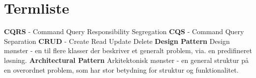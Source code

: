 \section{Termliste}
\textbf{CQRS} - Command Query Responsibility Segregation
\newline
\textbf{CQS} - Command Query Separation
\newline
\textbf{CRUD} - Create Read Update Delete
\newline
\textbf{Design Pattern} Design mønster - en til flere klasser der beskriver et generalt problem, via. en predifineret løsning. 
\newline
\textbf{Architectural Pattern} Arkitektonisk mønster - en general struktur på en overordnet problem, som har stor betydning for struktur og funktionalitet.

